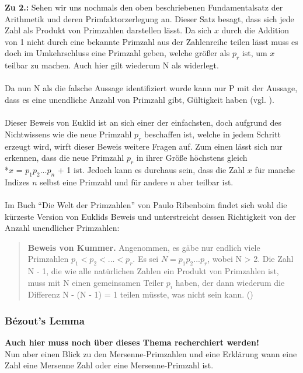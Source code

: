 \documentclass[german,12pt,a4paper]{article}
\begin{document}
\textbf{Zu 2.:} Sehen wir uns nochmals den oben beschriebenen Fundamentalsatz der Arithmetik und deren Primfaktorzerlegung an. Dieser Satz besagt, dass sich jede Zahl als Produkt von Primzahlen darstellen lässt. Da sich $x$ durch die Addition von 1 nicht durch eine bekannte Primzahl aus der Zahlenreihe teilen lässt muss es doch im Umkehrschluss eine Primzahl geben, welche größer als $p_r$ ist, um $x$ teilbar zu machen. Auch hier gilt wiederum N als widerlegt.\\
\\Da nun N als die falsche Aussage identifiziert wurde kann nur P mit der Aussage, dass es eine unendliche Anzahl von Primzahl gibt, Gültigkeit haben (vgl. \cite[3]{Ribenboim2006}).\\
\\Dieser Beweis von Euklid ist an sich einer der einfachsten, doch aufgrund des Nichtwissens wie die neue Primzahl $p_r$ beschaffen ist, welche in jedem Schritt erzeugt wird, wirft dieser Beweis weitere Fragen auf. Zum einen lässt sich nur erkennen, dass die neue Primzahl $p_r$ in ihrer Größe höchstens gleich
\\*$x$ = $p_1p_2...p_n$ + 1 ist. Jedoch kann es durchaus sein, dass die Zahl $x$ für manche Indizes $n$ selbst eine Primzahl und für andere $n$ aber teilbar ist.\\
\\Im Buch “Die Welt der Primzahlen” von Paulo Ribenboim findet sich wohl die kürzeste Version von Euklids Beweis und unterstreicht dessen Richtigkeit von der Anzahl unendlicher Primzahlen:\\
\begin{quote}
\small
\textbf{Beweis von Kummer.} Angenommen, es gäbe nur endlich viele Primzahlen $p_1 < p_2 <...< p_r$. Es sei $N = p_1p_2...p_r$, wobei N > 2. Die Zahl N - 1, die wie alle natürlichen Zahlen ein Produkt von Primzahlen ist, muss mit N einen gemeinsamen Teiler $p_i$ haben, der dann wiederum die Differenz N - (N - 1) = 1 teilen müsste, was nicht sein kann. (\cite[4]{Ribenboim2006})
\end{quote}

\subsubsection{Bézout's Lemma}
\textbf{Auch hier muss noch über dieses Thema recherchiert werden!}\\

Nun aber einen Blick zu den Mersenne-Primzahlen und eine Erklärung wann eine Zahl eine Mersenne Zahl oder eine Mersenne-Primzahl ist.
\end{document}
